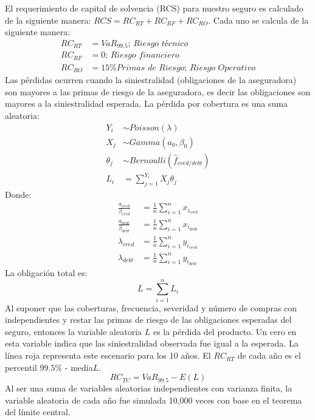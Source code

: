 \documentclass{article}
\begin{document}
El requerimiento de capital de solvencia (RCS) para nuestro seguro es calculado de la siguiente manera: $RCS = RC_{RT} + RC_{RF} + RC_{RO}$. Cada uno se calcula de la siguiente manera:
\begin{align*}
    RC_{RT} &= VaR_{99.5} \textit{;         Riesgo técnico} \\
    RC_{RF} &=  0 \textit{;         Riesgo financiero} \\
    RC_{RO} &= 15\% \textit{Primas de Riesgo;} 
    \textit{              Riesgo Operativo} 
\end{align*}
Las pérdidas ocurren cuando la siniestralidad (obligaciones de la aseguradora) son mayores a las primas de riesgo de la aseguradora, es decir las obligaciones son mayores a la siniestralidad esperada. La pérdida por cobertura es una suma aleatoria: 
\begin{align*}
    Y_i &\sim Poisson(\lambda) \\
    X_j &\sim Gamma(a_0, \beta_0) \\
    \theta_j &\sim Bernoulli(\hat{f}_{cred/debt}) \\
    L_i &= \sum\limits_{j= 1}^{Y_i} X_j \theta_j
\end{align*}
Donde: 
\begin{align*}
    \frac{a_{cred}}{\beta_{cred} } &= \frac{1}{n} \sum\limits_{i=1}^{n}
    x_{i_{cred}} \\
    \frac{a_{debt}}{\beta_{debt} } &= \frac{1}{n} \sum\limits_{i=1}^{n}
    x_{i_{debt}} \\
    \lambda_{cred} &= \frac{1}{n} \sum\limits_{i=1}^{n}
    y_{i_{cred}} \\
     \lambda_{debt} &= \frac{1}{n} \sum\limits_{i=1}^{n}
    y_{i_{debt}}
\end{align*}
La obligación total es: 
\begin{equation*}
    L = \sum\limits_{i=1}^{n} L_i
\end{equation*}
Al suponer que las coberturas, frecuencia, severidad y número de compras con independientes y restar las primas de riesgo de las obligaciones esperadas del seguro, entonces la variable aleatoria $L$ es la pérdida del producto. 
Un cero en esta variable indica que las siniestralidad observada fue igual a la esperada. La línea roja representa este escenario para los 10 años. El $RC_{RT}$ de cada año es el percentil $99.5\%$ - media$L$. 
\begin{equation*}
    RC_{TC} = VaR_{99.5} - E(L)
\end{equation*}
Al ser una suma de variables aleatorias independientes con varianza finita, la variable aleatoria de cada año fue simulada 10,000 veces con base en el teorema del límite central.
\end{document}
